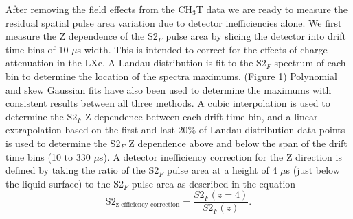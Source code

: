 After removing the field effects from the CH$_3$T data we are ready to measure the residual spatial pulse area variation due to detector inefficiencies alone.  We first measure the Z dependence of the S2$_F$ pulse area by slicing the detector into drift time bins of 10 $\mu$s width.  This is intended to correct for the effects of charge attenuation in the LXe. A Landau distribution is fit to the S2$_F$ spectrum of each bin to determine the location of the spectra maximums. (Figure \ref{fig:LandauPlot})  Polynomial and skew Gaussian fits have also been used to determine the maximums with consistent results between all three methods.  A cubic interpolation is used to determine the S2$_F$ Z dependence between each drift time bin, and a linear extrapolation based on the first and last 20\% of Landau distribution data points is used to determine the S2$_F$ Z dependence above and below the span of the drift time bins  (10 to 330 $\mu$s).  A detector inefficiency correction for the Z direction is defined by taking the ratio of the S2$_F$ pulse area at a height of 4 $\mu$s (just below the liquid surface) to the S2$_F$ pulse area as described in the equation
\begin{equation}\label{s2zcorr_eq}
\mbox{S}2_{\mbox{z-efficiency-correction}} = \frac{S2_F(z=4)}{S2_F(z)}.
\end{equation} 


\begin{figure} [!h]
\centering
{}
\qquad
{}
\label{fig:LandauPlot}
\end{figure}

